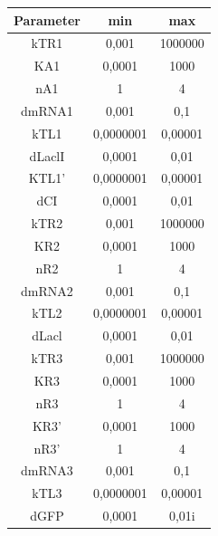 \documentclass{article}
\begin{document}
      \begin{figure}
      \begin{small} 
        \begin{tabular}{ | c |c | c |}
          \hline                       
            Parameter & min & max \\ \hline                       
            kTR1 &            0,001           &    1000000   \\ \hline    
            KA1 &             0,0001          &    1000 \\ \hline  
            nA1 &             1               &    4 \\ \hline
            dmRNA1 &          0,001           &    0,1 \\ \hline
            kTL1 &            0,0000001       &    0,00001 \\ \hline
            dLaclI &          0,0001          &    0,01 \\ \hline
            KTL1' &           0,0000001       &    0,00001 \\ \hline
            dCI &             0,0001          &    0,01 \\ \hline
            kTR2 &            0,001           &    1000000 \\ \hline
            KR2 &             0,0001          &    1000 \\ \hline
            nR2 &             1               &    4 \\ \hline
            dmRNA2 &          0,001           &    0,1 \\ \hline
            kTL2 &            0,0000001       &    0,00001 \\ \hline
            dLacl &           0,0001          &    0,01 \\ \hline
            kTR3 &            0,001           &    1000000 \\ \hline
            KR3 &             0,0001          &    1000 \\ \hline
            nR3 &             1               &    4 \\ \hline
            KR3' &            0,0001          &    1000 \\ \hline
            nR3' &            1               &    4 \\ \hline
            dmRNA3 &          0,001           &    0,1 \\ \hline
            kTL3 &            0,0000001       &    0,00001 \\ \hline
            dGFP &            0,0001          &    0,01i   \\ 
            \hline  
        \end{tabular}
      \end{small}
      \end{figure}
\end{document}
